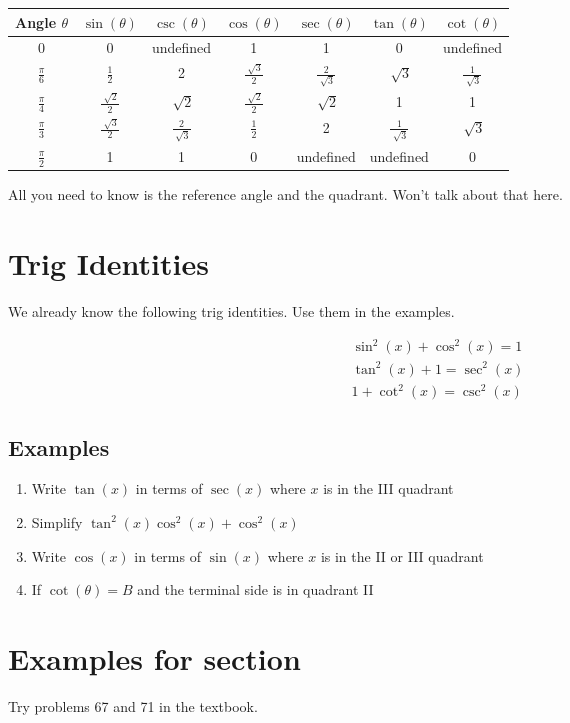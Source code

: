 \documentclass{tufte-handout}
\begin{document}
\begin{center}
\begin{tabular}{c | c | c | c | c | c | c}
Angle $\theta$ & $\sin(\theta)$ & $\csc(\theta)$ & $\cos(\theta)$ & $\sec(\theta)$ & $\tan(\theta)$ & $\cot(\theta)$ \\
\hline
0 & 0 & undefined & 1 & 1 & 0 & undefined \\
$\frac{\pi}{6}$ & $\frac{1}{2}$ & 2 & $\frac{\sqrt[]{3}}{2}$ & $\frac{2}{\sqrt[]{3}}$ & $ \sqrt[]{3}$ & $\frac{1}{\sqrt[]{3}}$ \\
$\frac{\pi}{4}$ & $\frac{\sqrt[]{2}}{2}$ & $\sqrt[]{2}$ & $\frac{\sqrt[]{2}}{2}$ & $\sqrt[]{2}$ & 1 & 1 \\
$\frac{\pi}{3}$ & $\frac{\sqrt[]{3}}{2}$ & $\frac{2}{\sqrt[]{3}}$ & $\frac{1}{2}$ & 2 & $\frac{1}{\sqrt[]{3}}$ & $ \sqrt[]{3}$ \\
$\frac{\pi}{2}$ & 1 & 1 & 0 & undefined & undefined & 0
\end{tabular}
\end{center}

All you need to know is the reference angle and the quadrant.  Won't talk about that here.

\section{Trig Identities}

We already know the following trig identities.  Use them in the examples.

\begin{align*}
\sin^2(x) + \cos^2(x) = 1 \\
\tan^2(x) + 1 = \sec^2(x) \\
1 + \cot^2(x) = \csc^2(x)
\end{align*}

\subsection{Examples}
\begin{enumerate}
\item Write $\tan(x)$ in terms of $\sec(x)$ where $x$ is in the III quadrant
\item Simplify $\tan^2(x) \cos^2(x) + \cos^2(x)$
\item Write $\cos(x)$ in terms of $\sin(x)$ where $x$ is in the II or III quadrant
\item If $\cot(\theta) = B$ and the terminal side is in quadrant II
\end{enumerate}

\section{Examples for section}
Try problems 67 and 71 in the textbook.
\end{document}

